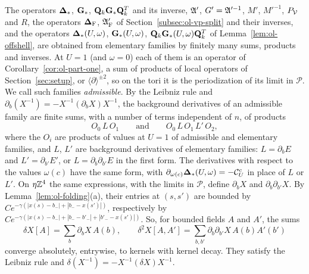 The operators $\boldsymbol{\Delta}_*$, $\mathbf G_*$, $\mathbf Q_k\mathbf G_*\mathbf Q_k^T$ and its inverse, $\mathfrak A'$, $G'=\mathfrak A'^{-1}$, $M'$, $M'^{-1}$, $P_\mathcal V$ and $R$, the operators $\boldsymbol{\Delta}_{\rm F}$, $\mathfrak A'_{\rm F}$ of Section~\ref{subsec:ol-vp-split} and their inverses, and the operators $\boldsymbol{\Delta}_*(U,\omega)$, $\mathbf G_*(U,\omega)$, $\mathbf Q_k\mathbf G_*(U,\omega)\mathbf Q_k^T$ of Lemma~\ref{lem:ol-offshell}, are obtained from elementary families by finitely many sums, products and inverses. At $U=1$ (and $\omega=0$) each of them is an operator of Corollary~\ref{cor:ol-part-one}, a sum of products of local operators of Section~\ref{sec:setup}, or $\langle\partial\rangle^{\pm2}$, so on the tori it is the periodization of its limit in $\mathscr P$. We call such families \emph{admissible}. By the Leibniz rule and $\partial_b(X^{-1})=-X^{-1}(\partial_bX)X^{-1}$, the background derivatives of an admissible family are finite sums, with a number of terms independent of $n$, of products
\begin{equation}\label{eq:ol-derivative-products}
O_0\,L\,O_1\qquad\text{and}\qquad O_0\,L\,O_1\,L'\,O_2 ,
\end{equation}
where the $O_i$ are products of values at $U=1$ of admissible and elementary families, and $L$, $L'$ are background derivatives of elementary families: $L=\partial_bE$ and $L'=\partial_{b'}E'$, or $L=\partial_b\partial_{b'}E$ in the first form. The derivatives with respect to the values $\omega(c)$ have the same form, with $\partial_{\omega(c)}\boldsymbol{\Delta}_*(U,\omega)=-\mathcal C^c_U$ in place of $L$ or $L'$. On $\eta\mathbb Z^4$ the same expressions, with the limits in $\mathscr P$, define $\partial_bX$ and $\partial_b\partial_{b'}X$. By Lemma~\ref{lem:ol-folding}(a), their entries at $(s,s')$ are bounded by $Ce^{-\gamma(|x(s)-b_-|+|b_--x(s')|)}$, respectively by $Ce^{-\gamma(|x(s)-b_-|+|b_--b'_-|+|b'_--x(s')|)}$. So, for bounded fields $A$ and $A'$, the sums
\[
\delta X[A]=\sum_b\partial_bX\,A(b),\qquad\delta^2X[A,A']=\sum_{b,b'}\partial_b\partial_{b'}X\,A(b)A'(b')
\]
converge absolutely, entrywise, to kernels with kernel decay. They satisfy the Leibniz rule and $\delta(X^{-1})=-X^{-1}(\delta X)X^{-1}$.

